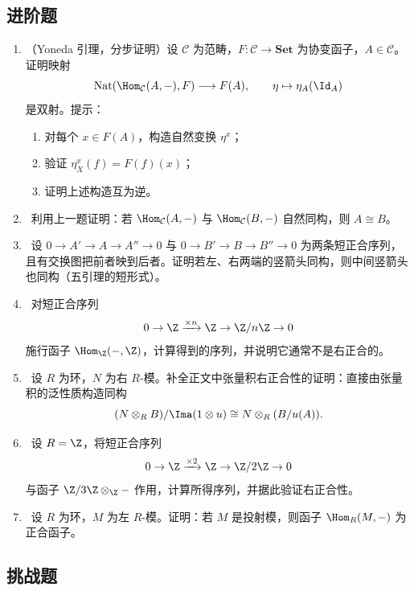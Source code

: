 \subsection*{进阶题}

\begin{enumerate}[resume, label=\textbf{习题A.\arabic*}, leftmargin=3.5em]
  \item \medium （Yoneda 引理，分步证明）设 $\mathcal C$ 为范畴，$F\colon \mathcal C\to \mathbf{Set}$ 为协变函子，$A\in \mathcal C$。证明映射
  \[
    \mathrm{Nat}(\Hom_{\mathcal C}(A,-),F)\longrightarrow F(A),
    \qquad \eta\mapsto \eta_A(\Id_A)
  \]
  是双射。提示：
  \begin{enumerate}[label=(\alph*), leftmargin=2.5em]
    \item 对每个 $x\in F(A)$，构造自然变换 $\eta^x$；
    \item 验证 $\eta^x_X(f)=F(f)(x)$；
    \item 证明上述构造互为逆。
  \end{enumerate}

  \item \medium\ 利用上一题证明：若 $\Hom_{\mathcal C}(A,-)$ 与 $\Hom_{\mathcal C}(B,-)$ 自然同构，则 $A\cong B$。

  \item \medium\ 设 $0\to A'\to A\to A''\to 0$ 与 $0\to B'\to B\to B''\to 0$ 为两条短正合序列，且有交换图把前者映到后者。证明若左、右两端的竖箭头同构，则中间竖箭头也同构（五引理的短形式）。

  \item \medium\ 对短正合序列
  \[
    0\to \Z \xrightarrow{\times n} \Z \to \Z/n\Z \to 0
  \]
  施行函子 $\Hom_{\Z}(-,\Z)$，计算得到的序列，并说明它通常不是右正合的。

  \item \medium\ 设 $R$ 为环，$N$ 为右 $R$-模。补全正文中张量积右正合性的证明：直接由张量积的泛性质构造同构
  \[
    (N\otimes_R B)/\Ima(1\otimes u)\cong N\otimes_R(B/u(A)).
  \]

  \item \medium\ 设 $R=\Z$，将短正合序列
  \[
    0\to \Z \xrightarrow{\times 2} \Z \to \Z/2\Z \to 0
  \]
  与函子 $\Z/3\Z\otimes_{\Z}-$ 作用，计算所得序列，并据此验证右正合性。

  \item \medium\ 设 $R$ 为环，$M$ 为左 $R$-模。证明：若 $M$ 是投射模，则函子 $\Hom_R(M,-)$ 为正合函子。
\end{enumerate}

\subsection*{挑战题}

